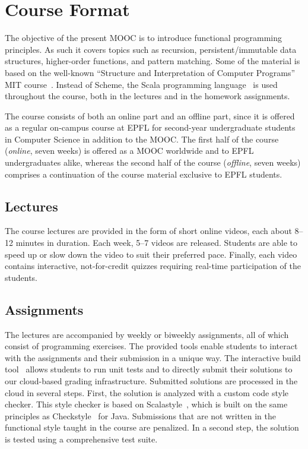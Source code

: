 \documentclass{sig-alternate}
\begin{document}
\section{Course Format}
\label{sec:course-format}

The objective of the present MOOC is to introduce functional programming
principles. As such it covers topics such as recursion, persistent/immutable data
structures, higher-order functions, and pattern matching. Some of the material
is based on the well-known ``Structure and Interpretation of Computer
Programs'' MIT course~\cite{Abelson85}. Instead of Scheme, the Scala
programming language~\cite{Odersky-Spoon-Venners07} is used throughout the
course, both in the lectures and in the homework assignments.

The course consists of both an online part and an offline part, since it is
offered as a regular on-campus course at EPFL for second-year undergraduate
students in Computer Science in addition to the MOOC. The first half of the course ({\em online}, seven weeks) is offered as a MOOC worldwide and to EPFL undergraduates alike, whereas the second half of the course ({\em offline}, seven weeks) comprises a continuation of the course material exclusive to EPFL students.

\subsection{Lectures}\label{sec:mooc-elements}

The course lectures are provided in the form of short
online videos, each about 8--12 minutes in duration. Each week, 5--7
videos are released. 
Students are able to speed up or slow down the video to suit their preferred pace. Finally, each video contains interactive, not-for-credit
quizzes requiring real-time participation of the students.

\subsection{Assignments}

The lectures are accompanied by weekly or biweekly assignments, all of which
consist of programming exercises. The provided tools enable students to
interact with the assignments and their submission in a unique way. The
interactive build tool~\cite{sbt} allows students to run unit tests and to
directly submit their solutions to our cloud-based grading infrastructure.
Submitted solutions are processed in the cloud in several steps. First, the
solution is analyzed with a custom code style checker. This style checker is based
on Scalastyle~\cite{ScalaStyle}, which is built on the same principles as
Checkstyle~\cite{Ware08} for Java. Submissions that are not written in the
functional style taught in the course are penalized. In a second step,
the solution is tested using a comprehensive test suite.
\end{document}
